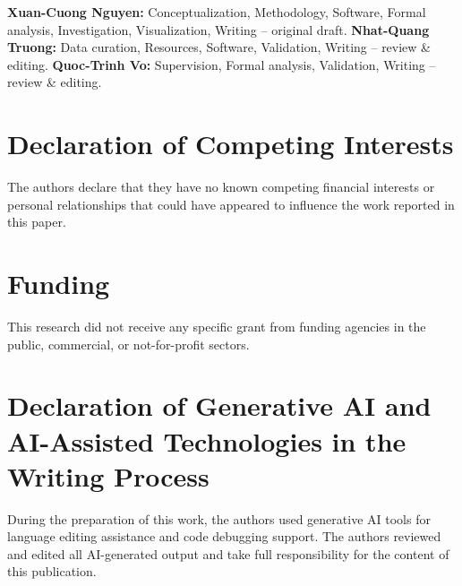 \documentclass[preprint,12pt]{elsarticle}
\begin{document}
\textbf{Xuan-Cuong Nguyen:} Conceptualization, Methodology, Software, Formal analysis, Investigation, Visualization, Writing -- original draft. \textbf{Nhat-Quang Truong:} Data curation, Resources, Software, Validation, Writing -- review \& editing. \textbf{Quoc-Trinh Vo:} Supervision, Formal analysis, Validation, Writing -- review \& editing.

\section*{Declaration of Competing Interests}

The authors declare that they have no known competing financial interests or personal relationships that could have appeared to influence the work reported in this paper.

\section*{Funding}

This research did not receive any specific grant from funding agencies in the public, commercial, or not-for-profit sectors.

\section*{Declaration of Generative AI and AI-Assisted Technologies in the Writing Process}

During the preparation of this work, the authors used generative AI tools for language editing assistance and code debugging support. The authors reviewed and edited all AI-generated output and take full responsibility for the content of this publication.
\end{document}
